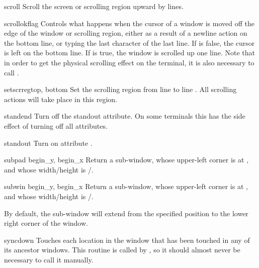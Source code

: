 \begin{methoddesc}[window]{scroll}{}
Scroll the screen or scrolling region upward by  lines.
\end{methoddesc}

\begin{methoddesc}[window]{scrollok}{flag}
Controls what happens when the cursor of a window is moved off the
edge of the window or scrolling region, either as a result of a
newline action on the bottom line, or typing the last character
of the last line.  If  is false, the cursor is left
on the bottom line.  If  is true, the window is
scrolled up one line.  Note that in order to get the physical
scrolling effect on the terminal, it is also necessary to call
.
\end{methoddesc}

\begin{methoddesc}[window]{setscrreg}{top, bottom}
Set the scrolling region from line  to line . All
scrolling actions will take place in this region.
\end{methoddesc}

\begin{methoddesc}[window]{standend}{}
Turn off the standout attribute.  On some terminals this has the
side effect of turning off all attributes.
\end{methoddesc}

\begin{methoddesc}[window]{standout}{}
Turn on attribute .
\end{methoddesc}

\begin{methoddesc}[window]{subpad}{ begin_y, begin_x}
Return a sub-window, whose upper-left corner is at
, and whose width/height is
/.
\end{methoddesc}

\begin{methoddesc}[window]{subwin}{ begin_y, begin_x}
Return a sub-window, whose upper-left corner is at
, and whose width/height is
/.

By default, the sub-window will extend from the
specified position to the lower right corner of the window.
\end{methoddesc}

\begin{methoddesc}[window]{syncdown}{}
Touches each location in the window that has been touched in any of
its ancestor windows.  This routine is called by ,
so it should almost never be necessary to call it manually.
\end{methoddesc}


